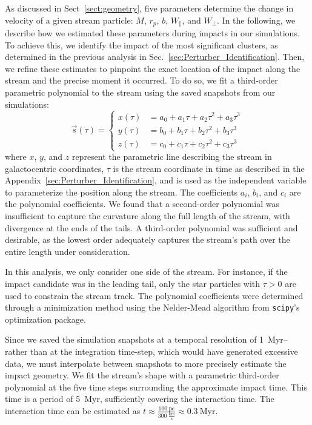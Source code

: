 \documentclass{aa}
\begin{document}
\begin{appendix}
    As discussed in Sect~\ref{sect:geometry},  five parameters determine the change in velocity of a given stream particle: $M$, $r_p$, $b$, $W_\parallel$, and $W_\perp$. In the following, we describe how we estimated these parameters during impacts in our simulations.
    To achieve this, we identify the impact of the most significant clusters, as determined in the previous analysis in Sec.~\ref{sec:Perturber_Identification}. Then, we refine these estimates to pinpoint the exact location of the impact along the stream and the precise moment it occurred. To do so, we fit a third-order parametric polynomial to the stream using the saved snapshots from our simulations:
      \begin{equation}
        \vec{s}(\tau) = 
        \left\{
          \begin{aligned}
            x(\tau) &= a_0 + a_1 \tau + a_2 \tau^2 + a_3 \tau^3 \\ 
            y(\tau) &= b_0 + b_1 \tau + b_2 \tau^2 + b_3 \tau^3 \\
            z(\tau) &= c_0 + c_1 \tau + c_2 \tau^2 + c_3 \tau^3
          \end{aligned}
        \right.
        \end{equation}  
      where $x$, $y$, and $z$ represent the parametric line describing the stream in galactocentric coordinates, $\tau$ is the stream coordinate in time as described in the Appendix~\ref{sec:Perturber_Identification}, and is used as the independent variable to parameterize the position along the stream. The coefficients $a_i$, $b_i$, and $c_i$ are the polynomial coefficients. We found that a second-order polynomial was insufficient to capture the curvature along the full length of the stream, with divergence at the ends of the tails. A third-order polynomial was sufficient and desirable, as the lowest order adequately captures the stream's path over the entire length under consideration.

      In this analysis, we only consider one side of the stream. For instance, if the impact candidate was in the leading tail, only the star particles with $\tau > 0$ are used to constrain the stream track. The polynomial coefficients were determined through a minimization method using the Nelder-Mead algorithm from \texttt{scipy}'s optimization package.

      Since we saved the simulation snapshots at a temporal resolution of 1~Myr--rather than at the integration time-step, which would have generated excessive data, we must interpolate between snapshots to more precisely estimate the impact geometry. We fit the stream's shape with a parametric third-order polynomial at the five time steps surrounding the approximate impact time. This time is a period of 5~Myr, sufficiently covering the interaction time. The interaction time can be estimated as $t \approx \frac{100~\text{pc}}{300~\frac{\text{km}}{\text{s}}} \approx 0.3~\text{Myr}$.


\end{appendix}
\end{document}

